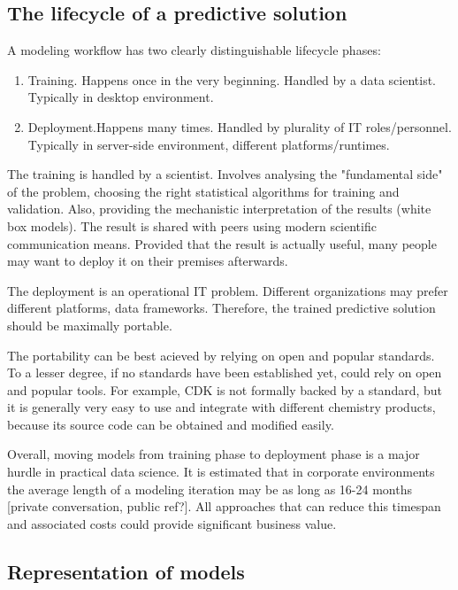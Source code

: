 \documentclass[12pt,letterpaper]{article}
\begin{document}
\subsection{The lifecycle of a predictive solution}

A modeling workflow has two clearly distinguishable lifecycle phases:
\begin{enumerate}
  \item Training. Happens once in the very beginning. Handled by a data
  scientist. Typically in desktop environment. 
  \item Deployment.Happens many times. Handled by plurality of IT 
  roles/personnel. Typically in server-side environment, different 
  platforms/runtimes. 
\end{enumerate}

The training is handled by a scientist. Involves analysing the
"fundamental side" of the problem, choosing the right statistical 
algorithms for training and validation. Also, providing the mechanistic
interpretation of the results (white box models). The result is 
shared with peers using modern scientific communication means. Provided
that the result is actually useful, many people may want to deploy it
on their premises afterwards.

The deployment is an operational IT problem. Different organizations 
may prefer different platforms, data frameworks. Therefore, the trained
predictive solution should be maximally portable.

The portability can be best acieved by relying on open and popular
standards. To a lesser degree, if no standards have been established yet,
could rely on open and popular tools. For example, CDK is not formally
backed by a standard, but it is generally very easy to use and integrate
with different chemistry products, because its source code can be obtained
and modified easily.

Overall, moving models from training phase to deployment phase is a
major hurdle in practical data science. It is estimated that in corporate
environments the average length of a modeling iteration may be as long
as 16-24 months [private conversation, public ref?]. All approaches that
can reduce this timespan and associated costs could provide significant
business value.

\subsection{Representation of models}
\end{document}
